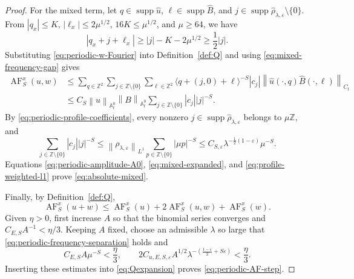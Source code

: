 \documentclass[12pt,reqno,letterpaper]{amsart}
\numberwithin{equation}{section}
\theoremstyle{definition}
\newcommand{\Z}{\mathbb Z}
\newcommand{\A}{\mathbb A}
\newcommand{\eps}{\varepsilon}
\newcommand{\la}{\lambda}
\newcommand{\supp}{\operatorname{supp}}
\newcommand{\norm}[1]{\left\lVert #1\right\rVert}
\newcommand{\abs}[1]{\left\lvert #1\right\rvert}
\begin{document}
\begin{proof}
For the mixed term, let $q\in\supp\widehat u$,
$\ell\in\supp\widehat B$, and
$j\in\supp\widehat\rho_{\la,\eps}\setminus\{0\}$.  From
$\abs{q_x}\leq K$, $\abs{\ell_x}\leq2\mu^{1/2}$,
$16K\leq\mu^{1/2}$, and $\mu\geq64$, we have
\begin{equation}\label{eq:mixed-frequency-gap}
   \abs{q_x+j+\ell_x}
      \geq\abs j-K-2\mu^{1/2}
      \geq\frac12\abs j.
\end{equation}
Substituting \eqref{eq:periodic-w-Fourier} into
Definition~\ref{def:Q} and using \eqref{eq:mixed-frequency-gap} gives
\begin{equation}\label{eq:mixed-expanded}
\begin{split}
   \operatorname{AF}_S^x(u,w)
      &\leq\sum_{q\in\Z^2}\sum_{j\in\Z\setminus\{0\}}
       \sum_{\ell\in\Z^2}
       \langle q+(j,0)+\ell\rangle^{-S}\abs{c_j}
       \norm{\widehat u(\cdot,q)
              \widehat B(\cdot,\ell)}_{C_t}\\
      &\leq C_S\norm{u}_{\A^0_t}\norm{B}_{\A^0_t}
          \sum_{j\in\Z\setminus\{0\}}\abs{c_j}\abs j^{-S}.
\end{split}
\end{equation}
By \eqref{eq:periodic-profile-coefficients}, every nonzero
$j\in\supp\widehat\rho_{\la,\eps}$ belongs to $\mu\Z$, and
\begin{equation}\label{eq:profile-weighted-l1}
 \sum_{j\in\Z\setminus\{0\}}\abs{c_j}\abs j^{-S}
 \leq\norm{\rho_{\la,\eps}}_{L^1}
      \sum_{p\in\Z\setminus\{0\}}\abs{\mu p}^{-S}
 \leq C_{S,\eps}\la^{-\frac12(1-\eps)}\mu^{-S}.
\end{equation}
Equations \eqref{eq:periodic-amplitude-A0}, \eqref{eq:mixed-expanded}, and
\eqref{eq:profile-weighted-l1} prove \eqref{eq:absolute-mixed}.

Finally, by Definition~\ref{def:Q},
\begin{equation}\label{eq:Qexpansion}
   \operatorname{AF}_S^x(u+w)
      \leq\operatorname{AF}_S^x(u)
       +2\operatorname{AF}_S^x(u,w)+\operatorname{AF}_S^x(w).
\end{equation}
Given $\eta>0$, first increase $A$ so that the binomial series converges and
$C_{E,S}A^{-1}<\eta/3$.  Keeping $A$ fixed, choose an admissible $\la$ so
large that \eqref{eq:periodic-frequency-separation} holds and
\[
   C_{E,S}A\mu^{-S}<\frac\eta3,
   \qquad
   2C_{u,E,S,\eps}A^{1/2}
       \la^{-\left(\frac{1-\eps}{2}+S\eps\right)}<\frac\eta3.
\]
Inserting these estimates into \eqref{eq:Qexpansion} proves
\eqref{eq:periodic-AF-step}.
\end{proof}
\end{document}
